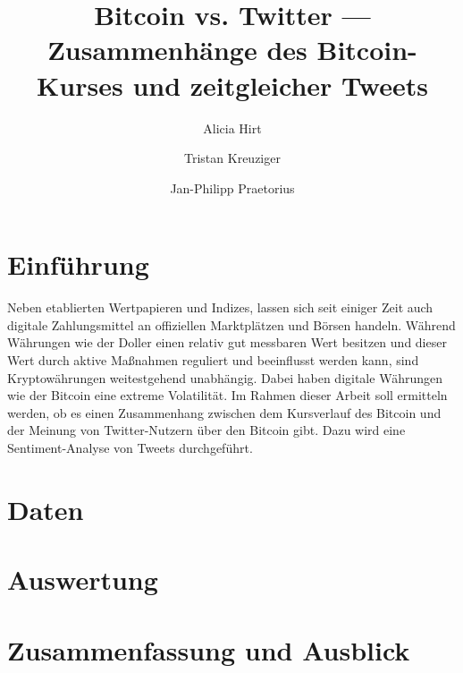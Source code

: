\documentclass[
journal=jacsat, %
manuscript=article]{achemso}
\author{Alicia Hirt}
\author{Tristan Kreuziger}
\author{Jan-Philipp Praetorius}
\affiliation[Friedrich-Schiller-Universität Jena]
{Faculty of Mathematics and Computer Science, Friedrich-Schiller-Universität Jena, Germany}
\title[Bitcoin vs. Twitter]
{Bitcoin vs. Twitter --- Zusammenh\"ange des Bitcoin-Kurses und zeitgleicher Tweets}
\begin{document}
	
\renewcommand{\figurename}{Abbildung}
\renewcommand{\lstlistingname}{Code}

\section{Einf\"uhrung}

Neben etablierten Wertpapieren und Indizes, lassen sich seit einiger Zeit auch digitale Zahlungsmittel an offiziellen Marktpl\"atzen und B\"orsen handeln. W\"ahrend W\"ahrungen wie der Doller einen relativ gut messbaren Wert besitzen und dieser Wert durch aktive Ma{\ss}nahmen reguliert und beeinflusst werden kann, sind Kryptow\"ahrungen weitestgehend unabh\"angig. Dabei haben digitale W\"ahrungen wie der Bitcoin eine extreme Volatilit\"at. Im Rahmen dieser Arbeit soll ermitteln werden, ob es einen Zusammenhang zwischen dem Kursverlauf des Bitcoin und der Meinung von Twitter-Nutzern \"uber den Bitcoin gibt. Dazu wird eine Sentiment-Analyse von Tweets durchgef\"uhrt.

\newpage

\section{Daten}




\section{Auswertung}


\section{Zusammenfassung und Ausblick}

\end{document}
